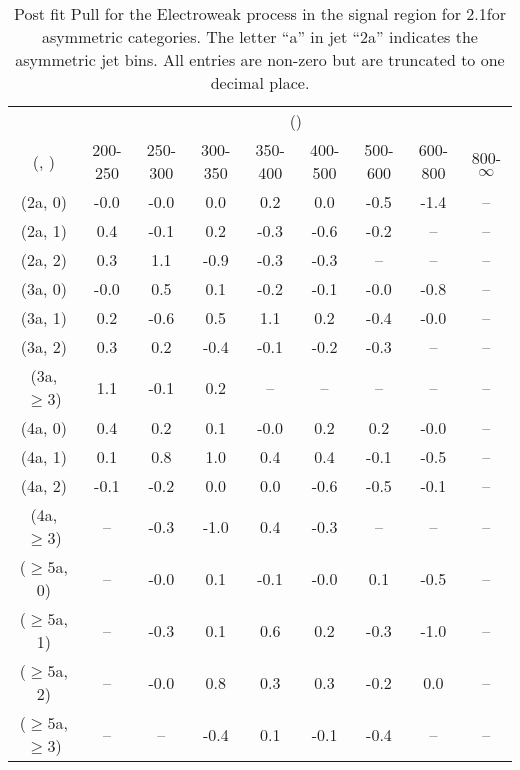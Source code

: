\begin{table}[h!]
\tiny
\centering
\caption{Post fit Pull for the Electroweak process in the signal region for 2.1\ifb for asymmetric categories. The letter ``a'' in jet \eg ``2a''  indicates the asymmetric jet bins. All entries are non-zero but are truncated to one decimal place.\label{tab:pullseppost_sig_ewk_asym}}
\begin{tabular}
{ccccccccc}
	\hline\hline
	& \multicolumn{8}{c}{\scalht (\gev)} \\ 
	 (\njet,  \nb) & 200-250 & 250-300 & 300-350 & 350-400 & 400-500 & 500-600 & 600-800 & 800-$\infty$ \\ [0.8ex] 
\hline
	(2a, 0) & -0.0 & -0.0 & 0.0 & 0.2 & 0.0 & -0.5 & -1.4 & -- \\[0.5ex] 
	(2a, 1) & 0.4 & -0.1 & 0.2 & -0.3 & -0.6 & -0.2 & -- & -- \\[0.5ex] 
	(2a, 2) & 0.3 & 1.1 & -0.9 & -0.3 & -0.3 & -- & -- & -- \\[0.5ex] 
	(3a, 0) & -0.0 & 0.5 & 0.1 & -0.2 & -0.1 & -0.0 & -0.8 & -- \\[0.5ex] 
	(3a, 1) & 0.2 & -0.6 & 0.5 & 1.1 & 0.2 & -0.4 & -0.0 & -- \\[0.5ex] 
	(3a, 2) & 0.3 & 0.2 & -0.4 & -0.1 & -0.2 & -0.3 & -- & -- \\[0.5ex] 
	(3a, $\ge3$) & 1.1 & -0.1 & 0.2 & -- & -- & -- & -- & -- \\[0.5ex] 
	(4a, 0) & 0.4 & 0.2 & 0.1 & -0.0 & 0.2 & 0.2 & -0.0 & -- \\[0.5ex] 
	(4a, 1) & 0.1 & 0.8 & 1.0 & 0.4 & 0.4 & -0.1 & -0.5 & -- \\[0.5ex] 
	(4a, 2) & -0.1 & -0.2 & 0.0 & 0.0 & -0.6 & -0.5 & -0.1 & -- \\[0.5ex] 
	(4a, $\ge3$) & -- & -0.3 & -1.0 & 0.4 & -0.3 & -- & -- & -- \\[0.5ex] 
	($\ge5$a, 0) & -- & -0.0 & 0.1 & -0.1 & -0.0 & 0.1 & -0.5 & -- \\[0.5ex] 
	($\ge5$a, 1) & -- & -0.3 & 0.1 & 0.6 & 0.2 & -0.3 & -1.0 & -- \\[0.5ex] 
	($\ge5$a, 2) & -- & -0.0 & 0.8 & 0.3 & 0.3 & -0.2 & 0.0 & -- \\[0.5ex] 
	($\ge5$a, $\ge3$) & -- & -- & -0.4 & 0.1 & -0.1 & -0.4 & -- & -- \\[0.5ex] 
	\hline
	\hline
\end{tabular}
\end{table}
